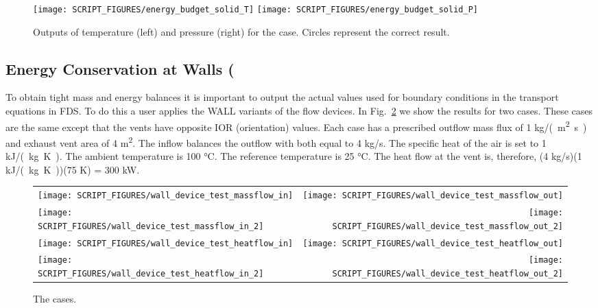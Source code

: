 \documentclass[11pt]{book}
\begin{document}
\begin{figure}[ht]
\texttt{[image: SCRIPT\_FIGURES/energy\_budget\_solid\_T]}
\texttt{[image: SCRIPT\_FIGURES/energy\_budget\_solid\_P]}
\caption[The  test case]{\label{fig_solid_energy} Outputs of temperature (left) and pressure (right) for the  case.  Circles represent the correct result.}
\end{figure}


\subsection{Energy Conservation at Walls (\texorpdfstring{})}
\label{mass_heat_wall_device_test}
\label{mass_heat_wall_device_test_2}

To obtain tight mass and energy balances it is important to output the actual values used for boundary conditions in the transport equations in FDS.  To do this a user applies the WALL variants of the flow devices.  In Fig.~\ref{mass_heat_wall_device} we show the results for two cases.  These cases are the same except that the vents have opposite {\ct IOR} (orientation) values.  Each case has a prescribed outflow mass flux of 1 \si{kg/(m^2.s)} and exhaust vent area of 4 \si{m^2}.  The inflow balances the outflow with both equal to 4 \si{kg/s}.  The specific heat of the air is set to 1 \si{kJ/(kg.K)}.  The ambient temperature is 100 \si{\degreeCelsius}.  The reference temperature is 25 \si{\degreeCelsius}.  The heat flow at the vent is, therefore, (4 \si{kg/s})(1 \si{kJ/(kg.K)})(75 K) = 300 kW.

\begin{figure}[p]
\begin{tabular*}{\textwidth}{lr}
\texttt{[image: SCRIPT\_FIGURES/wall\_device\_test\_massflow\_in]} &
\texttt{[image: SCRIPT\_FIGURES/wall\_device\_test\_massflow\_out]} \\
\texttt{[image: SCRIPT\_FIGURES/wall\_device\_test\_massflow\_in\_2]} &
\texttt{[image: SCRIPT\_FIGURES/wall\_device\_test\_massflow\_out\_2]} \\
\texttt{[image: SCRIPT\_FIGURES/wall\_device\_test\_heatflow\_in]} &
\texttt{[image: SCRIPT\_FIGURES/wall\_device\_test\_heatflow\_out]} \\
\texttt{[image: SCRIPT\_FIGURES/wall\_device\_test\_heatflow\_in\_2]} &
\texttt{[image: SCRIPT\_FIGURES/wall\_device\_test\_heatflow\_out\_2]}
\end{tabular*}
\caption[The  cases]{The  cases.}
\label{mass_heat_wall_device}
\end{figure}
\end{document}
